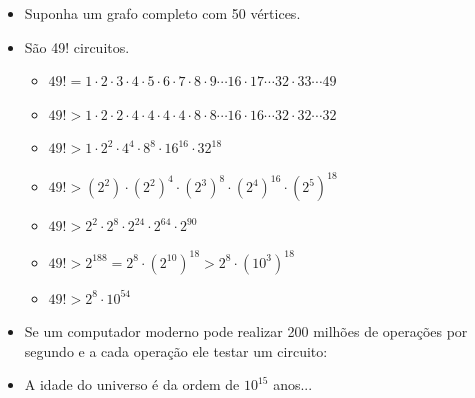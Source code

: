 
\begin{frame}
	\begin{itemize}[<+->]
		\item Suponha um grafo completo com 50 vértices.
		\item São 49! circuitos.
			\begin{itemize}
				\item $49! = 1{\cdot}2{\cdot}3{\cdot}4{\cdot}5{\cdot}6{\cdot}7{\cdot}8{\cdot}9{\cdots}16{\cdot}17{\cdots}32{\cdot}33{\cdots}49$
				\item $49! > 1{\cdot}2{\cdot}2{\cdot}4{\cdot}4{\cdot}4{\cdot}4{\cdot}8{\cdot}8{\cdots}16{\cdot}16{\cdots}32{\cdot}32{\cdots}32$
				\item $49! > 1{\cdot}2^2{\cdot}4^4{\cdot}8^8{\cdot}16^{16}{\cdot}32^{18}$
				\item $49! > (2^2){\cdot}(2^2)^4{\cdot}(2^3)^8{\cdot}(2^4)^{16}{\cdot}(2^5)^{18}$
				\item $49! > 2^2{\cdot}2^8{\cdot}2^{24}{\cdot}2^{64}{\cdot}2^{90}$
				\item $49! > 2^{188} =  2^8{\cdot}(2^{10})^{18} >  2^8{\cdot}(10^3)^{18}$
				\item $49! >2^8{\cdot}10^{54}$
			\end{itemize}
		\item Se um computador moderno pode realizar 200 milhões de operações 
		por segundo e a cada operação ele testar um circuito:
		\item A idade do universo é da ordem de $10^{15}$ anos...
	\end{itemize}
\end{frame}
